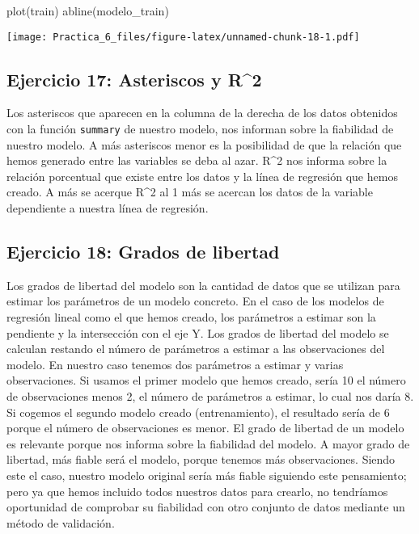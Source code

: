 \documentclass[
]{article}
\newenvironment{Shaded}{\begin{snugshade}}{\end{snugshade}}
\newcommand{\FunctionTok}[1]{\textcolor[rgb]{0.00,0.00,0.00}{#1}}
\newcommand{\NormalTok}[1]{#1}
\begin{document}
\begin{Shaded}
\begin{Highlighting}[]
\FunctionTok{plot}\NormalTok{(train)}
\FunctionTok{abline}\NormalTok{(modelo\_train)}
\end{Highlighting}
\end{Shaded}

\texttt{[image: Practica\_6\_files/figure-latex/unnamed-chunk-18-1.pdf]}

\hypertarget{ejercicio-17-asteriscos-y-r2}{%
\subsection{Ejercicio 17: Asteriscos y
R\^{}2}\label{ejercicio-17-asteriscos-y-r2}}

Los asteriscos que aparecen en la columna de la derecha de los datos
obtenidos con la función \texttt{summary} de nuestro modelo, nos
informan sobre la fiabilidad de nuestro modelo. A más asteriscos menor
es la posibilidad de que la relación que hemos generado entre las
variables se deba al azar. R\^{}2 nos informa sobre la relación
porcentual que existe entre los datos y la línea de regresión que hemos
creado. A más se acerque R\^{}2 al 1 más se acercan los datos de la
variable dependiente a nuestra línea de regresión.

\hypertarget{ejercicio-18-grados-de-libertad}{%
\subsection{Ejercicio 18: Grados de
libertad}\label{ejercicio-18-grados-de-libertad}}

Los grados de libertad del modelo son la cantidad de datos que se
utilizan para estimar los parámetros de un modelo concreto. En el caso
de los modelos de regresión lineal como el que hemos creado, los
parámetros a estimar son la pendiente y la intersección con el eje Y.
Los grados de libertad del modelo se calculan restando el número de
parámetros a estimar a las observaciones del modelo. En nuestro caso
tenemos dos parámetros a estimar y varias observaciones. Si usamos el
primer modelo que hemos creado, sería 10 el número de observaciones
menos 2, el número de parámetros a estimar, lo cual nos daría 8. Si
cogemos el segundo modelo creado (entrenamiento), el resultado sería de
6 porque el número de observaciones es menor. El grado de libertad de un
modelo es relevante porque nos informa sobre la fiabilidad del modelo. A
mayor grado de libertad, más fiable será el modelo, porque tenemos más
observaciones. Siendo este el caso, nuestro modelo original sería más
fiable siguiendo este pensamiento; pero ya que hemos incluido todos
nuestros datos para crearlo, no tendríamos oportunidad de comprobar su
fiabilidad con otro conjunto de datos mediante un método de validación.
\end{document}
